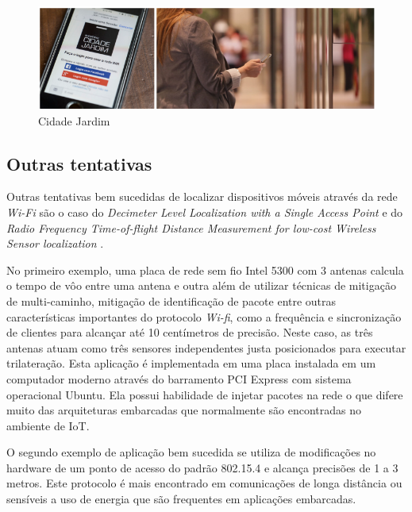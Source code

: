 \begin{figure}[htb]
	\caption{\label{fig:projeto}Cidade Jardim }
	\begin{center}
		\includegraphics[width=1\textwidth]{020-fundamentacao/img/cidade-jardim.png}
	\end{center}
\end{figure}

\subsection{Outras tentativas}
\label{subsec:Outras tentativas}

Outras tentativas bem sucedidas de localizar dispositivos móveis através da rede
\emph{Wi-Fi} são o caso do \emph{Decimeter Level Localization with a Single
Access Point} \cite{Vasisht} e do \emph{Radio Frequency Time-of-flight Distance
Measurement for low-cost Wireless Sensor localization} \cite{Lanzisera2011}.

No primeiro exemplo, uma placa de rede sem fio Intel 5300 com 3 antenas calcula o tempo
de vôo entre uma antena e outra além de utilizar técnicas de mitigação de
multi-caminho, mitigação de identificação de pacote entre outras características
importantes do protocolo \emph{Wi-fi}, como a frequência e sincronização de clientes
para alcançar até 10 centímetros de precisão. Neste caso, as três antenas atuam
como três sensores independentes justa posicionados para executar trilateração.
Esta aplicação é implementada em uma placa instalada em um computador moderno
através do barramento PCI Express com sistema operacional Ubuntu. Ela possui habilidade
de injetar pacotes na rede o que difere muito das arquiteturas embarcadas que
normalmente são encontradas no ambiente de IoT.

O segundo exemplo de aplicação bem sucedida se utiliza de modificações no
hardware de um ponto de acesso do padrão 802.15.4 e alcança precisões de 1 a 3
metros. Este protocolo é mais encontrado em comunicações de longa distância ou
sensíveis a uso de energia que são frequentes em aplicações embarcadas.

